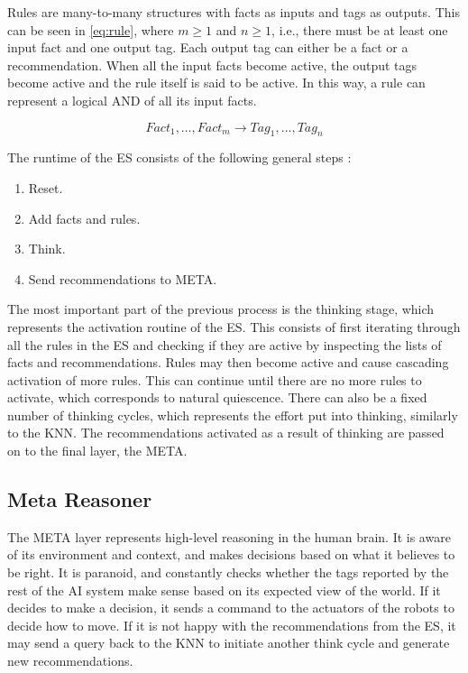 \documentclass[titlepage,11pt]{article}
\begin{document}

Rules are many-to-many structures with facts as inputs and tags as outputs. This can be seen in \autoref{eq:rule}, where $m \geq 1$ and $n \geq 1$, i.e., there must be at least one input fact and one output tag. Each output tag can either be a fact or a recommendation. When all the input facts become active, the output tags become active and the rule itself is said to be active. In this way, a rule can represent a logical AND of all its input facts.

\begin{equation} \label{eq:rule}
	Fact_1, \ldots, Fact_m \rightarrow Tag_1, \ldots, Tag_n
\end{equation}

The runtime of the ES consists of the following general steps \cite{vybihal-expert}:

\begin{enumerate}
	\item Reset.
	\item Add facts and rules.
	\item Think.
	\item Send recommendations to META.
\end{enumerate}

The most important part of the previous process is the thinking stage, which represents the activation routine of the ES. This consists of first iterating through all the rules in the ES and checking if they are active by inspecting the lists of facts and recommendations. Rules may then become active and cause cascading activation of more rules. This can continue until there are no more rules to activate, which corresponds to natural quiescence. There can also be a fixed number of thinking cycles, which represents the effort put into thinking, similarly to the KNN. The recommendations activated as a result of thinking are passed on to the final layer, the META.

\subsection{Meta Reasoner}

The META layer represents high-level reasoning in the human brain. It is aware of its environment and context, and makes decisions based on what it believes to be right. It is paranoid, and constantly checks whether the tags reported by the rest of the AI system make sense based on its expected view of the world. If it decides to make a decision, it sends a command to the actuators of the robots to decide how to move. If it is not happy with the recommendations from the ES, it may send a query back to the KNN to initiate another think cycle and generate new recommendations.
\end{document}

